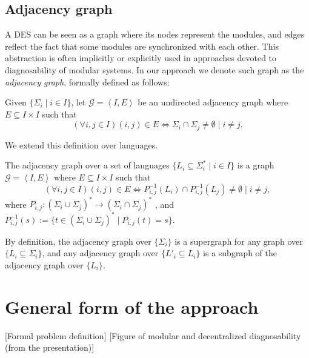 \documentclass[a4paper, 10pt, conference]{ieeeconf}
\begin{document}
\subsection{Adjacency graph}
A DES can be seen as a graph where its nodes represent the modules, and edges
reflect the fact that some modules are synchronized with each other. This
abstraction is often implicitly or explicitly used in approaches devoted to
diagnosability of modular systems. In our approach we denote such graph as the
\emph{adjacency graph}, formally defined as follows:
\begin{definition}
\label{def:graph_events}
Given $\{\Sigma_i \mid i \in I \}$, let $\mathcal{G} = \left<I, E\right>$ be an
undirected adjacency graph where $E \subseteq I \times
I$ such that 
$$(\forall i, j \in I)(i, j) \in E \Leftrightarrow 
	\Sigma_i \cap \Sigma_j \neq \emptyset \mid i \neq j.$$
\end{definition}
We extend this definition over languages.
\begin{definition}
\label{def:graph_languages}
The adjacency graph over a set of languages $\{L_i \subseteq \Sigma_i^* \mid i
\in I \}$ is a graph $\mathcal{G} = \left<I, E\right>$ where $E \subseteq I \times
I$ such that 
$$(\forall i, j \in I)(i, j) \in E \Leftrightarrow
	P_{i,j}^{-1}(L_i) \cap P_{i,j}^{-1}(L_j) \neq \emptyset \mid i \neq j, 
$$
where 
$P_{i,j} : (\Sigma_i \cup \Sigma_j)^* \rightarrow (\Sigma_i \cap \Sigma_j)^*$
, and  
$P_{i,j}^{-1}(s) := \{t \in (\Sigma_i \cup \Sigma_j)^* \mid P_{i,j}(t) = s\}$.
\end{definition}

By definition, the adjacency graph over $\{\Sigma_i\}$ is a supergraph for any
graph over $\{L_i \subseteq \Sigma_i\}$, and any adjacency graph over $\{L'_i
\subseteq L_i\}$ is a subgraph of the adjacency graph over $\{L_i\}$.



\section{General form of the approach}
\label{sec:General}

[Formal problem definition]
[Figure of modular and decentralized diagnosability (from the presentation)]
\end{document}
